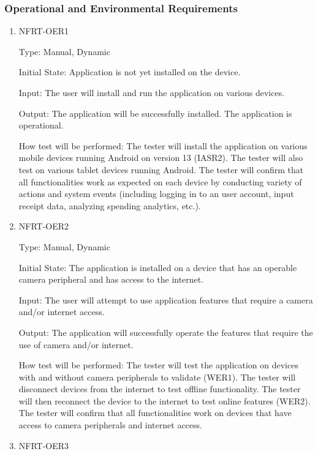 \documentclass[12pt, titlepage]{article}
\begin{document}
\subsubsection{Operational and Environmental Requirements}

\begin{enumerate}
\item{NFRT-OER1\\}

Type: Manual, Dynamic

Initial State: Application is not yet installed on the device.
                
Input: The user will install and run the application on various devices.
                
Output: The application will be successfully installed. The application is operational.
                
How test will be performed: The tester will install the application on various mobile devices running Android on version 13 (IASR2). The tester will also test on various tablet devices running Android. The tester will confirm that all functionalities work as expected on each device by conducting variety of actions and system events (including logging in to an user account, input receipt data, analyzing spending analytics, etc.).

\item{NFRT-OER2\\}

Type: Manual, Dynamic

Initial State: The application is installed on a device that has an operable camera peripheral and has access to the internet.
                
Input: The user will attempt to use application features that require a camera and/or internet access.
                
Output: The application will successfully operate the features that require the use of camera and/or internet.
                
How test will be performed: The tester will test the application on devices with and without camera peripherals to validate (WER1). The tester will disconnect devices from the internet to test offline functionality. The tester will then reconnect the device to the internet to test online features (WER2). The tester will confirm that all functionalities work on devices that have access to camera peripherals and internet access.

\item{NFRT-OER3\\}


\end{enumerate}
\end{document}
